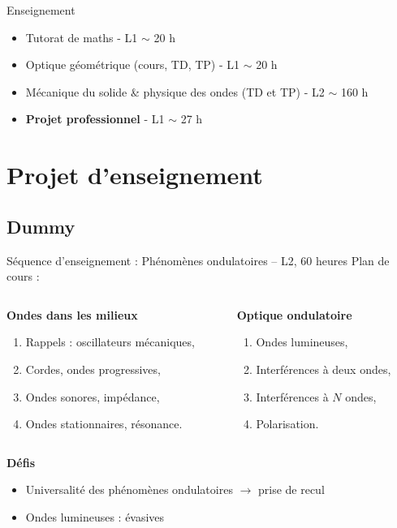 \begin{frame}{Enseignement}
\begin{itemize}
	\item Tutorat de maths - L1 $\sim$ 20 h
	\item Optique géométrique (cours, TD, TP) - L1 $\sim$ 20 h
	\item Mécanique du solide \& physique des ondes (TD et TP) - L2 $\sim$ 160 h
	\item \textbf{Projet professionnel} - L1 $\sim$ 27 h
\end{itemize}
\end{frame}

\section{Projet d'enseignement}
\subsection{Dummy}
\begin{frame}{Séquence d'enseignement : Phénomènes ondulatoires -- L2, 60 heures}
Plan de cours :
\begin{columns}
	\begin{column}{0.5\textwidth}
		\begin{block}{\textbf{Ondes dans les milieux}}
			\begin{enumerate}
				\item Rappels : oscillateurs mécaniques,
				\item Cordes, ondes progressives,
				\item Ondes sonores, impédance,
				\item Ondes stationnaires, résonance.
			\end{enumerate}
		\end{block}
	\end{column}
	\begin{column}{0.5\textwidth}
		\begin{block}{\textbf{Optique ondulatoire}}
			\begin{enumerate}
				\item Ondes lumineuses,
				\item Interférences à deux ondes,
				\item Interférences à $N$ ondes,
				\item Polarisation.
			\end{enumerate}
		\end{block}
	\end{column}
\end{columns}
\begin{block}{\textbf{Défis}}
	\begin{itemize}
		\item Universalité des phénomènes ondulatoires $\to$ prise de recul
		\item Ondes lumineuses : évasives
	\end{itemize}
\end{block}
\end{frame}


